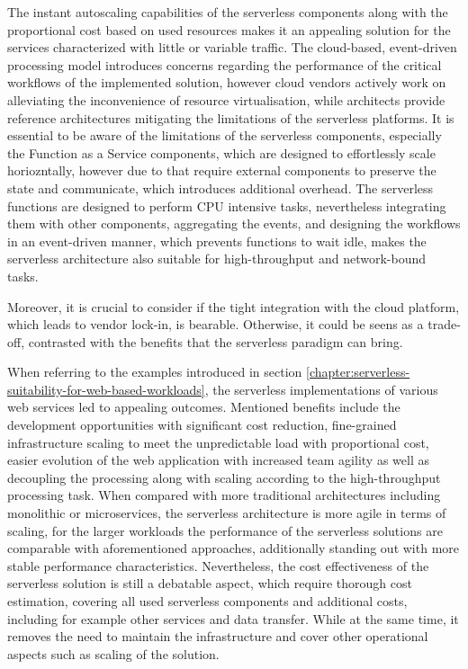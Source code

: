 The instant autoscaling capabilities of the serverless components along with the proportional cost based on used resources makes it an appealing solution for the services characterized with little or variable traffic.
The cloud-based, event-driven processing model introduces concerns regarding the performance of the critical workflows of the implemented solution, however cloud vendors actively work on alleviating the inconvenience of resource virtualisation, while architects provide reference architectures mitigating the limitations of the serverless platforms.
It is essential to be aware of the limitations of the serverless components, especially the Function as a Service components, which are designed to effortlessly scale horiozntally, however due to that require external components to preserve the state and communicate, which introduces additional overhead.
The serverless functions are designed to perform CPU intensive tasks, nevertheless integrating them with other components, aggregating the events, and designing the workflows in an event-driven manner, which prevents functions to wait idle, makes the serverless architecture also suitable for high-throughput and network-bound tasks.

Moreover, it is crucial to consider if the tight integration with the cloud platform, which leads to vendor lock-in, is bearable.
Otherwise, it could be seens as a trade-off, contrasted with the benefits that the serverless paradigm can bring.

When referring to the examples introduced in section \ref{chapter:serverless-suitability-for-web-based-workloads}, the serverless implementations of various web services led to appealing outcomes.
Mentioned benefits include the development opportunities with significant cost reduction, fine-grained infrastructure scaling to meet the unpredictable load with proportional cost, easier evolution of the web application with increased team agility as well as decoupling the processing along with scaling according to the high-throughput processing task.
When compared with more traditional architectures including monolithic or microservices, the serverless architecture is more agile in terms of scaling, for the larger workloads the performance of the serverless solutions are comparable with aforementioned approaches, additionally standing out with more stable performance characteristics.
Nevertheless, the cost effectiveness of the serverless solution is still a debatable aspect, which require thorough cost estimation, covering all used serverless components and additional costs, including for example other services and data transfer.
While at the same time, it removes the need to maintain the infrastructure and cover other operational aspects such as scaling of the solution.

